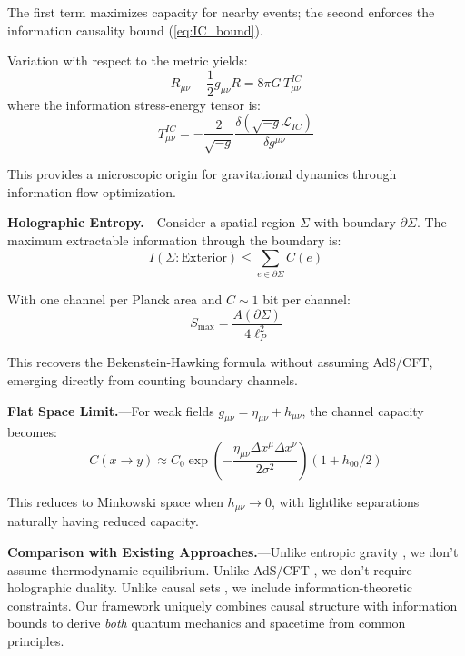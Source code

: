 \documentclass[aps,prl,twocolumn,showpacs,superscriptaddress,groupedaddress]{revtex4-2}
\begin{document}
The first term maximizes capacity for nearby events; the second enforces the information causality bound (\ref{eq:IC_bound}).

Variation with respect to the metric yields:
\begin{equation}
R_{\mu\nu} - \frac{1}{2}g_{\mu\nu}R = 8\pi G \, T^{IC}_{\mu\nu}
\label{eq:einstein_IC}
\end{equation}
where the information stress-energy tensor is:
\begin{equation}
T^{IC}_{\mu\nu} = -\frac{2}{\sqrt{-g}} \frac{\delta(\sqrt{-g}\mathcal{L}_{IC})}{\delta g^{\mu\nu}}
\end{equation}

This provides a microscopic origin for gravitational dynamics through information flow optimization.

\textbf{Holographic Entropy.}---Consider a spatial region $\Sigma$ with boundary $\partial\Sigma$. The maximum extractable information through the boundary is:
\begin{equation}
I(\Sigma : \text{Exterior}) \leq \sum_{e \in \partial\Sigma} C(e)
\end{equation}

With one channel per Planck area and $C \sim 1$ bit per channel:
\begin{equation}
S_{\max} = \frac{A(\partial\Sigma)}{4\ell_P^2}
\end{equation}

This recovers the Bekenstein-Hawking formula without assuming AdS/CFT, emerging directly from counting boundary channels.

\textbf{Flat Space Limit.}---For weak fields $g_{\mu\nu} = \eta_{\mu\nu} + h_{\mu\nu}$, the channel capacity becomes:
\begin{equation}
C(x \to y) \approx C_0 \exp\left(-\frac{\eta_{\mu\nu}\Delta x^\mu \Delta x^\nu}{2\sigma^2}\right)(1 + h_{00}/2)
\end{equation}

This reduces to Minkowski space when $h_{\mu\nu} \to 0$, with lightlike separations naturally having reduced capacity.

\textbf{Comparison with Existing Approaches.}---Unlike entropic gravity \cite{Verlinde2011}, we don't assume thermodynamic equilibrium. Unlike AdS/CFT \cite{Maldacena1998}, we don't require holographic duality. Unlike causal sets \cite{Sorkin2003}, we include information-theoretic constraints. Our framework uniquely combines causal structure with information bounds to derive \textit{both} quantum mechanics and spacetime from common principles.
\end{document}
